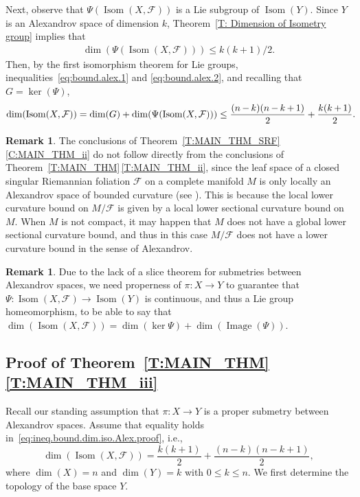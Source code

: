 \documentclass[pdftex]{sigma}
\numberwithin{equation}{section}
\theoremstyle{definition}
\newtheorem{rem}[thm]{Remark}
\DeclareMathOperator{\Iso}{Isom}
\DeclareMathOperator{\img}{Image}
\newcommand{\fol}{\mathcal{F}}
\begin{document}
Next, observe that $\Psi(\Iso(X,\fol))$ is a Lie subgroup of $\Iso(Y)$. Since $Y$ is an Alexandrov space of dimension $k$, Theorem~\ref{T: Dimension of Isometry group} implies that
\begin{align}\label{eq:bound.alex.2}
\dim(\Psi(\Iso(X,\fol))) \leq k(k+1)/2.
\end{align}
Then, by the first isomorphism theorem for Lie groups, inequalities~\eqref{eq:bound.alex.1} and \eqref{eq:bound.alex.2}, and recalling that $G=\ker(\Psi)$,
\begin{align}
\dim ( \Iso (X,\fol) )  = \dim (G) + \dim (\Psi(\Iso(X,\fol)) ) \leq \frac{(n\hspace{-0.5pt}-\hspace{-0.5pt}k)(n\hspace{-0.5pt}-\hspace{-0.5pt}k\hspace{-0.5pt}+\hspace{-0.5pt}1)}{2} +\frac{k(k\hspace{-0.5pt}+\hspace{-0.5pt}1)}{2}.\!\!\!\label{eq:ineq.bound.dim.iso.Alex.proof}
\end{align}

\begin{rem}
The conclusions of Theorem~\ref{T:MAIN_THM_SRF}\,\ref{C:MAIN_THM_ii} do not follow directly from the conclusions of Theorem~\ref{T:MAIN_THM}\,\ref{T:MAIN_THM_ii}, since the leaf space of a closed singular Riemannian foliation $\fol$ on a complete manifold $M$ is only locally an Alexandrov space of bounded curvature (see \cite[p.~119]{LytchakThorbergsson2010}). This is because the local lower curvature bound on $M/\fol$ is given by a local lower sectional curvature bound on $M$. When $M$ is not compact, it may happen that $M$ does not have a global lower sectional curvature bound, and thus in this case $M/\fol$ does not have a lower curvature bound in the sense of Alexandrov.
\end{rem}

\begin{rem}
Due to the lack of a slice theorem for submetries between Alexandrov spaces, we need properness of $\pi\colon X\to Y$ to guarantee that $\Psi\colon \Iso(X,\fol)\to \Iso(Y)$ is continuous, and thus a Lie group homeomorphism, to be able to say that $\dim(\Iso(X,\fol))=\dim(\ker\Psi)+\dim(\img(\Psi))$.
\end{rem}

\subsection[Proof of Theorem B]{Proof of Theorem~\ref{T:MAIN_THM}\,\ref{T:MAIN_THM_iii}}Recall our standing assumption that $\pi\colon X\to Y$ is a proper submetry between Alexandrov spaces.
Assume that equality holds in~\eqref{eq:ineq.bound.dim.iso.Alex.proof}, i.e.,
\[
\dim(\Iso(X,\fol)) = \frac{k(k+1)}{2}+\frac{(n-k)(n-k+1)}{2},
\]	
where $\dim(X) = n$ and $\dim(Y) = k$ with $0\leq k\leq n$. We first determine the topology of the base space $Y$.
\end{document}
